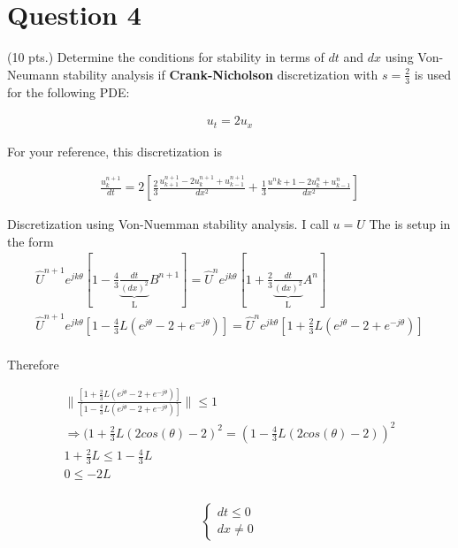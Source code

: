 \documentclass{article}
\begin{document}
\section*{Question 4}
(10 pts.) Determine the conditions for stability in terms of $dt$ and $dx$ using Von-Neumann stability analysis if \textbf{Crank-Nicholson} discretization with $s = \frac{2}{3}$ is used for the following PDE:

\begin{gather*}
	u_{t} = 2u_{x}
\end{gather*}

For your reference, this discretization is

\begin{gather*}
	\frac{ u^{n+1}_{k} }{ dt } = 2 \left[ \frac{2}{3} \frac{u^{n+1}_{k+1} - 2u^{n+1}_{k} + u^{n+1}_{k-1} }{ dx^{2} }  + \frac{1}{3}\frac{u^{n}{k+1} - 2u^{n}_{k} + u^{n}_{k-1}}{dx^{2}} \right]
\end{gather*}

Discretization using Von-Nuemman stability analysis. I call $u = U$
The is setup in the form
\begin{gather*}
\hat{U}^{n+1}e^{jk\theta}\left[ 1 - \frac{4}{3}\underbrace{\frac{dt}{(dx)^{2}}}_{\text{L}}B^{n+1}\right] =  \hat{U}^ne^{jk\theta} \left[ 1 + \frac{2}{3}\underbrace{\frac{dt}{(dx)^{2}}}_{\text{L}}A^{n}\right]\\
\hat{U}^{n+1}e^{jk\theta}\left[ 1 - \frac{4}{3}L(e^{j\theta} - 2 + e^{-j\theta})\right] =
\hat{U}^{n}e^{jk\theta}\left[ 1 + \frac{2}{3}L(e^{j\theta} - 2 + e^{-j\theta}) \right]\\
\end{gather*}

Therefore

\begin{gather*}
  \| \frac{\left[ 1 + \frac{2}{3}L(e^{j\theta} - 2 + e^{-j\theta}) \right]}{\left[ 1 - \frac{4}{3}L(e^{j\theta} - 2 + e^{-j\theta})\right]} \| \leq 1\\
  \Rightarrow (1+\frac{2}{3}L(2cos(\theta) - 2 )^{2} = (1 - \frac{4}{3}L(2cos(\theta) - 2))^{2} \\
  1 + \frac{2}{3}L \leq 1 - \frac{4}{3}L \\
  0 \leq -2L\\
\end{gather*}

\begin{gather*}
\begin{cases}
    dt \leq 0 \\
    dx \neq 0
 \end{cases}
\end{gather*}
\end{document}
